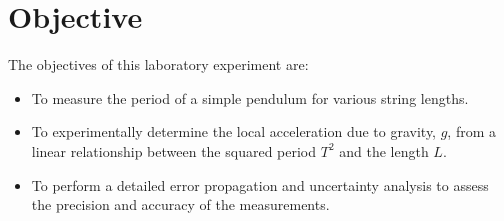 \section{Objective}
The objectives of this laboratory experiment are:
\begin{itemize}
  \item To measure the period of a simple pendulum for various string lengths.
  \item To experimentally determine the local acceleration due to gravity, $g$, from a linear relationship between the squared period $T^2$ and the length $L$.
  \item To perform a detailed error propagation and uncertainty analysis to assess the precision and accuracy of the measurements.
\end{itemize}

